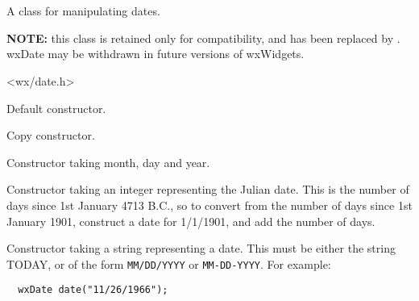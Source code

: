 \section{}\label{wxdate}

A class for manipulating dates.

{\bf NOTE:} this class is retained only for compatibility,
and has been replaced by . wxDate
may be withdrawn in future versions of wxWidgets.




<wx/date.h>




\label{wxdateconstr}


Default constructor.


Copy constructor.


Constructor taking month, day and year.


Constructor taking an integer representing the Julian date. This is the number of days since
1st January 4713 B.C., so to convert from the number of days since 1st January 1901,
construct a date for 1/1/1901, and add the number of days.


Constructor taking a string representing a date. This must be either the string TODAY, or of the
form {\tt MM/DD/YYYY} or {\tt MM-DD-YYYY}. For example:

\begin{verbatim}
  wxDate date("11/26/1966");
\end{verbatim}




